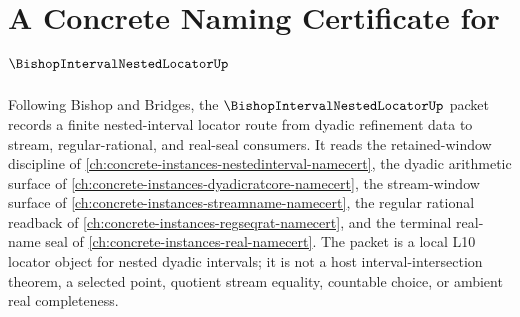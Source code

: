\chapter{A Concrete Naming Certificate for $\BishopIntervalNestedLocatorUp$}
\label{ch:concrete-instances-bishop-interval-nested-locator-namecert}

Following Bishop and Bridges, the $\BishopIntervalNestedLocatorUp$ packet records a finite nested-interval locator route from dyadic refinement data to stream, regular-rational, and real-seal consumers. It reads the retained-window discipline of \autoref{ch:concrete-instances-nestedinterval-namecert}, the dyadic arithmetic surface of \autoref{ch:concrete-instances-dyadicratcore-namecert}, the stream-window surface of \autoref{ch:concrete-instances-streamname-namecert}, the regular rational readback of \autoref{ch:concrete-instances-regseqrat-namecert}, and the terminal real-name seal of \autoref{ch:concrete-instances-real-namecert}. The packet is a local L10 locator object for nested dyadic intervals; it is not a host interval-intersection theorem, a selected point, quotient stream equality, countable choice, or ambient real completeness.

